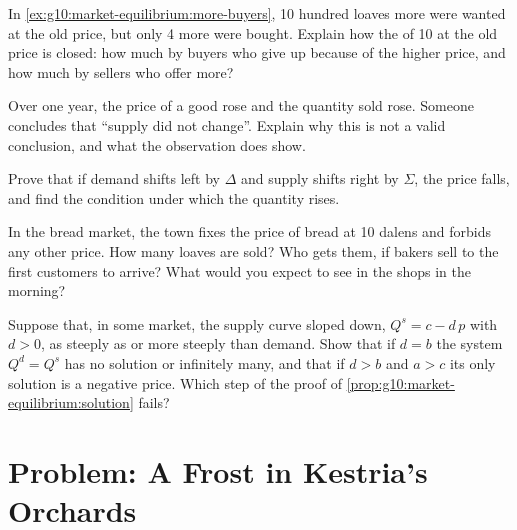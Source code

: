 \begin{exercise}[$\star\star$]\label{exo:g10:market-equilibrium:11}
In \cref{ex:g10:market-equilibrium:more-buyers}, 10 hundred loaves more were wanted at the old price, but only 4 more were bought. Explain how the
 of 10 at the old price is closed: how much by buyers who give up because of the higher price, and how much by sellers who offer
more?
\end{exercise}

\begin{exercise}[$\star\star\star$]\label{exo:g10:market-equilibrium:12}
Over one year, the price of a good rose and the quantity sold rose. Someone concludes that ``supply did not change''. Explain why this is not a
valid conclusion, and what the observation does show.
\end{exercise}

\begin{exercise}[$\star\star\star$]\label{exo:g10:market-equilibrium:13}
Prove that if demand shifts left by $\Delta$ and supply shifts right by $\Sigma$, the price falls, and find the condition under which the quantity
rises.
\end{exercise}

\begin{exercise}[$\star\star\star$]\label{exo:g10:market-equilibrium:14}
In the bread market, the town fixes the price of bread at 10 dalens and forbids any other price. How many loaves are sold? Who gets them, if bakers
sell to the first customers to arrive? What would you expect to see in the shops in the morning?
\end{exercise}

\begin{exercise}[$\star\star\star$]\label{exo:g10:market-equilibrium:15}
Suppose that, in some market, the supply curve sloped down, $Q^s = c - d\,p$ with $d > 0$, as steeply as or more steeply than demand. Show that
if $d = b$ the system $Q^d = Q^s$ has no solution or infinitely many, and that if $d > b$ and $a > c$ its only solution is a negative
price. Which step of the proof of \cref{prop:g10:market-equilibrium:solution} fails?
\end{exercise}

\section{Problem: A Frost in Kestria's Orchards}

